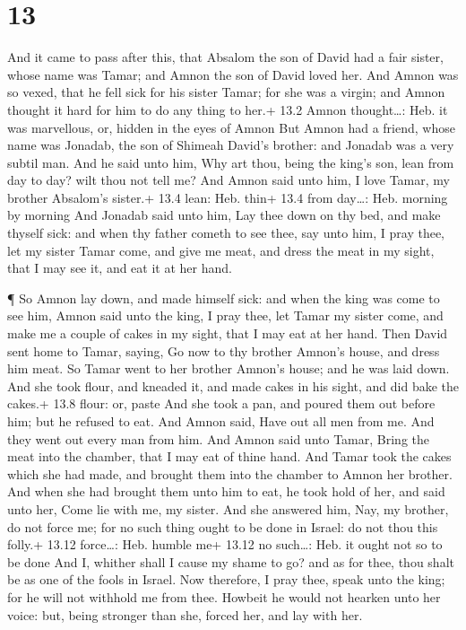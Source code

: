 \hypertarget{section-12}{%
\section{13}\label{section-12}}

 And it came to pass after this, that Absalom the son of
David had a fair sister, whose name was Tamar; and Amnon the son of
David loved her.  And Amnon was so vexed, that he fell sick
for his sister Tamar; for she was a virgin; and Amnon thought it hard
for him to do any thing to her.+ 13.2 Amnon thought\ldots: Heb. it was
marvellous, or, hidden in the eyes of Amnon  But Amnon had a
friend, whose name was Jonadab, the son of Shimeah David's brother: and
Jonadab was a very subtil man.  And he said unto him, Why
art thou, being the king's son, lean from day to day? wilt thou not tell
me? And Amnon said unto him, I love Tamar, my brother Absalom's sister.+
13.4 lean: Heb. thin+ 13.4 from day\ldots: Heb. morning by morning
 And Jonadab said unto him, Lay thee down on thy bed, and
make thyself sick: and when thy father cometh to see thee, say unto him,
I pray thee, let my sister Tamar come, and give me meat, and dress the
meat in my sight, that I may see it, and eat it at her hand.

 ¶ So Amnon lay down, and made himself sick: and when the
king was come to see him, Amnon said unto the king, I pray thee, let
Tamar my sister come, and make me a couple of cakes in my sight, that I
may eat at her hand.  Then David sent home to Tamar, saying,
Go now to thy brother Amnon's house, and dress him meat.  So
Tamar went to her brother Amnon's house; and he was laid down. And she
took flour, and kneaded it, and made cakes in his sight, and did bake
the cakes.+ 13.8 flour: or, paste  And she took a pan, and
poured them out before him; but he refused to eat. And Amnon said, Have
out all men from me. And they went out every man from him. 
And Amnon said unto Tamar, Bring the meat into the chamber, that I may
eat of thine hand. And Tamar took the cakes which she had made, and
brought them into the chamber to Amnon her brother.  And
when she had brought them unto him to eat, he took hold of her, and said
unto her, Come lie with me, my sister.  And she answered
him, Nay, my brother, do not force me; for no such thing ought to be
done in Israel: do not thou this folly.+ 13.12 force\ldots: Heb. humble
me+ 13.12 no such\ldots: Heb. it ought not so to be done 
And I, whither shall I cause my shame to go? and as for thee, thou shalt
be as one of the fools in Israel. Now therefore, I pray thee, speak unto
the king; for he will not withhold me from thee.  Howbeit
he would not hearken unto her voice: but, being stronger than she,
forced her, and lay with her.

